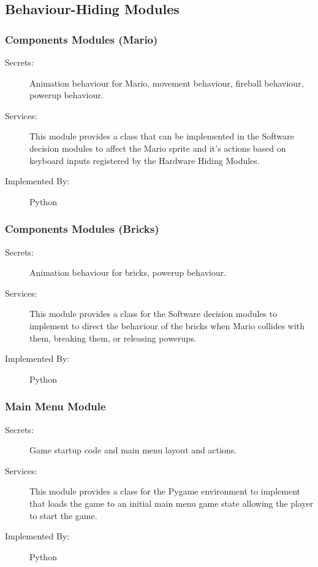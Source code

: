 \documentclass[12pt, titlepage]{article}
\begin{document}
\subsection{Behaviour-Hiding Modules}

\subsubsection{Components Modules (Mario)}
\begin{description}
\item[Secrets:]Animation behaviour for Mario, movement behaviour, fireball behaviour,
    powerup behaviour.
\item[Services:] This module provides a class that can be implemented in the Software decision modules
    to affect the Mario sprite and it's actions based on keyboard inputs registered by the Hardware Hiding Modules.
\item[Implemented By:] Python
\end{description}

\subsubsection{Components Modules (Bricks)}
\begin{description}
\item[Secrets:]Animation behaviour for bricks, powerup behaviour.
\item[Services:] This module provides a class for the Software decision modules to implement to direct the behaviour of the bricks when Mario collides with them, breaking them, or releasing powerups.
\item[Implemented By:] Python
\end{description}

\subsubsection{Main Menu Module}
\begin{description}
\item[Secrets:]Game startup code and main menu layout and actions.
\item[Services:] This module provides a class for the Pygame environment to implement that loads the game
    to an initial main menu game state allowing the player to start the game.
\item[Implemented By:] Python
\end{description}
\end{document}
